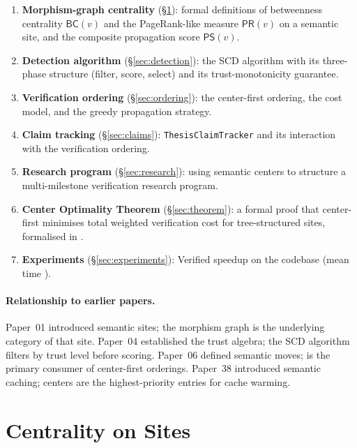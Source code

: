\documentclass[11pt]{article}
\newcommand{\BC}{\mathsf{BC}}               %
\newcommand{\PRank}{\mathsf{PR}}            %
\newcommand{\PropScore}{\mathsf{PS}}        %
\newcommand{\SCD}{\textsc{SCD}}             %
\begin{document}
\begin{enumerate}[label=(\roman*)]
\item \textbf{Morphism-graph centrality} (\S\ref{sec:centrality}):
  formal definitions of betweenness centrality $\BC(v)$ and the
  PageRank-like measure $\PRank(v)$ on a semantic site, and the
  composite propagation score $\PropScore(v)$.
\item \textbf{Detection algorithm} (\S\ref{sec:detection}):
  the \SCD{} algorithm with its three-phase structure (filter, score,
  select) and its trust-monotonicity guarantee.
\item \textbf{Verification ordering} (\S\ref{sec:ordering}):
  the center-first ordering, the cost model, and the greedy
  propagation strategy.
\item \textbf{Claim tracking} (\S\ref{sec:claims}):
  \texttt{ThesisClaimTracker} and its interaction with the
  verification ordering.
\item \textbf{Research program} (\S\ref{sec:research}):
  using semantic centers to structure a multi-milestone verification
  research program.
\item \textbf{Center Optimality Theorem} (\S\ref{sec:theorem}):
  a formal proof that center-first minimises total weighted
  verification cost for tree-structured sites, formalised in \LEAN{}.
\item \textbf{Experiments} (\S\ref{sec:experiments}):
  Verified speedup on the \JuGeo{} codebase (mean time \expTimeMean{}).
\end{enumerate}

\paragraph{Relationship to earlier papers.}
Paper~01 introduced semantic sites; the morphism graph is the underlying
category of that site.  Paper~04 established the trust algebra; the
\SCD{} algorithm filters by trust level before scoring.  Paper~06
defined semantic moves; \VERIFY{} is the primary consumer of
center-first orderings.  Paper~38 introduced semantic caching; centers
are the highest-priority entries for cache warming.

\section{Centrality on Sites}\label{sec:centrality}
\end{document}
